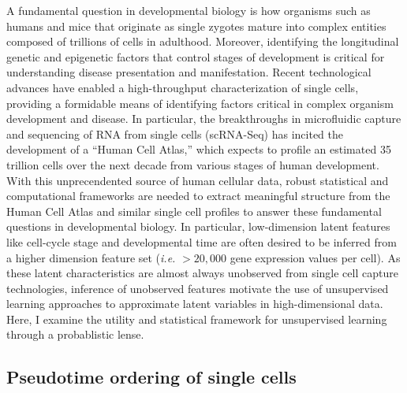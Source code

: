 \documentclass[english, 11pt]{article}\usepackage[]{graphicx}\usepackage[]{color}
\begin{document}
A fundamental question in developmental biology is how organisms such as humans and mice that originate as single zygotes mature into complex entities composed of trillions of cells in adulthood. Moreover, identifying the longitudinal genetic and epigenetic factors that control stages of development is critical for understanding disease presentation and manifestation.  Recent technological advances have enabled a high-throughput characterization of single cells, providing a formidable means of identifying factors critical in complex organism development and disease. In particular, the breakthroughs in microfluidic capture and sequencing of RNA from single cells (scRNA-Seq) has incited the development of a ``Human Cell Atlas,'' which expects to profile an estimated 35 trillion cells over the next decade from various stages of human development. \cite{HCA} 
\newline  \newline 
\noindent With this unprecendented source of human cellular data, robust statistical and computational frameworks are needed to extract meaningful structure from the Human Cell Atlas and similar single cell profiles to answer these fundamental questions in developmental biology. In particular, low-dimension latent features like cell-cycle stage and developmental time are often desired to be inferred from a higher dimension feature set (\textit{i.e.} $> 20,000$ gene expression values per cell). As these latent characteristics are almost always unobserved from single cell capture technologies, inference of unobserved features motivate the use of unsupervised learning approaches to approximate latent variables in high-dimensional data. Here, I examine the utility and statistical framework for unsupervised learning through a probablistic lense. 


\subsection{Pseudotime ordering of single cells}
\end{document}
